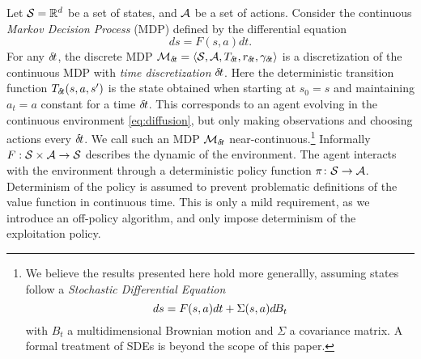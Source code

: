       
Let ${\cal S} = \mathbb{R}^d$ be a set of states, and ${\cal A}$ be a set of
actions. Consider the continuous \emph{Markov Decision Process} (MDP) defined by the differential equation %
        \begin{equation}
	\label{eq:diffusion}
	ds = F(s, a)dt. %
              \end{equation}
        For any ${\delta\hspace{-.1em}t}$, the discrete MDP ${\cal
M}_{\delta\hspace{-.1em}t} = \langle {\cal S}, {\cal A}, T_{{\delta\hspace{-.1em}t}}, r_{\delta\hspace{-.1em}t},
      \gamma_{\delta\hspace{-.1em}t}\rangle$ is a discretization of the continuous MDP with
      \emph{time discretization} ${\delta\hspace{-.1em}t}$. Here the deterministic
      transition function
      $T_{\delta\hspace{-.1em}t}(s, a, s')$ is %
      the
      state obtained
      when starting at $s_0 = s$ and maintaining $a_t=a$ constant for a time
      ${\delta\hspace{-.1em}t}$.
      This corresponds to an agent evolving in the continuous
      environment \eqref{eq:diffusion}, but 
      only making observations and choosing actions every ${\delta\hspace{-.1em}t}$. We
      call such an  MDP ${\cal M}_{\delta\hspace{-.1em}t}$
      near-continuous.\footnote{
      We believe the results presented here hold more
      generallly, assuming states
      follow a \emph{Stochastic Differential Equation} \begin{equation}
	      ds = F(s, a)dt  + \Sigma(s, a)d\hspace{-.1em}B_t
	      \label{eq:sde}
      \end{equation} with
      $B_t$ a multidimensional Brownian motion and $\Sigma$ a covariance matrix. A
      formal treatment of SDEs is beyond the scope of this paper.}
      Informally $F: {\cal S}\times{\cal A}\rightarrow {\cal S}$ describes
the dynamic of the environment. The agent interacts with the environment through a deterministic policy function
$\pi \colon {\cal S} \rightarrow {\cal A}$. Determinism of the policy is assumed to prevent problematic definitions
of the value function in continuous time. This is only a mild requirement, as we introduce an off-policy algorithm,
and only impose determinism of the exploitation policy.


